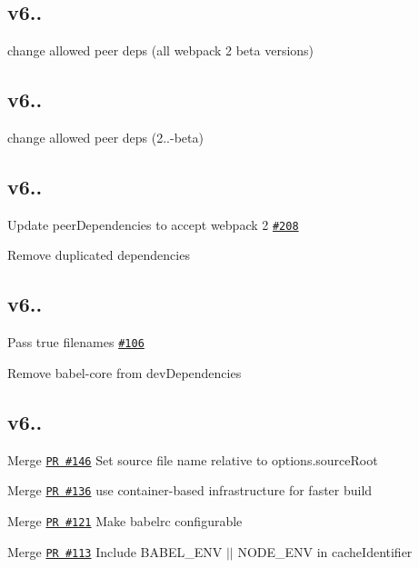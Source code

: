 \subsection*{v6..}


\begin{DoxyItemize}
\item change allowed peer deps (all webpack 2 beta versions)
\end{DoxyItemize}

\subsection*{v6..}


\begin{DoxyItemize}
\item change allowed peer deps (2..-\/beta)
\end{DoxyItemize}

\subsection*{v6..}


\begin{DoxyItemize}
\item Update peer\+Dependencies to accept webpack 2 \href{https://github.com/babel/babel-loader/pull/208}{\tt \#208}
\item Remove duplicated dependencies
\end{DoxyItemize}

\subsection*{v6..}


\begin{DoxyItemize}
\item Pass true filenames \href{https://github.com/babel/babel-loader/issues/106}{\tt \#106}
\item Remove babel-\/core from dev\+Dependencies
\end{DoxyItemize}

\subsection*{v6..}


\begin{DoxyItemize}
\item Merge \href{https://github.com/babel/babel-loader/pull/146}{\tt PR \#146} Set source file name relative to options.\+source\+Root
\item Merge \href{https://github.com/babel/babel-loader/pull/136}{\tt PR \#136} use container-\/based infrastructure for faster build
\item Merge \href{https://github.com/babel/babel-loader/pull/121}{\tt PR \#121} Make babelrc configurable
\item Merge \href{https://github.com/babel/babel-loader/pull/113}{\tt PR \#113} Include B\+A\+B\+E\+L\+\_\+\+E\+NV $\vert$$\vert$ N\+O\+D\+E\+\_\+\+E\+NV in cache\+Identifier
\end{DoxyItemize}

